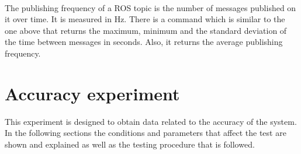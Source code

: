 \begin{itemize}
		\\

		The publishing frequency of a ROS topic is the number of messages published on it over time. 
		It is measured in Hz. 
		There is a command which is similar to the one above that returns the maximum, minimum and the standard deviation of the time between messages in seconds. 
		Also, it returns the average publishing frequency.  


\newpage

\section{Accuracy experiment}

	This experiment is designed to obtain data related to the accuracy of the system. 
	In the following sections the conditions and parameters that affect the test are shown and explained as well as the testing procedure that is followed. 




\end{itemize}
